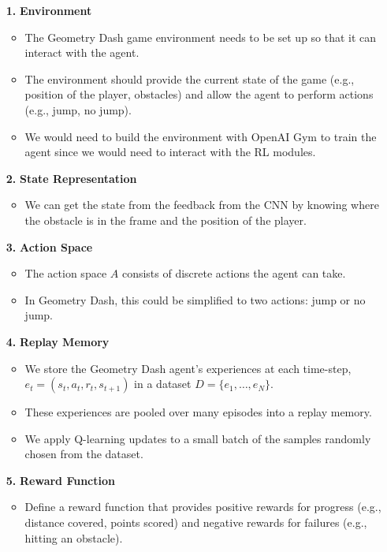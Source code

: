 \documentclass{article} %
\begin{document}
\begin{itemize}
    \item[\textbf{1.}] \textbf{Environment}
    \begin{itemize}
        \item The Geometry Dash game environment needs to be set up so that it 
        can interact with the agent. 
        \item The environment should provide the current state of the game 
        (e.g., position of the player, obstacles) and allow the agent to perform 
        actions (e.g., jump, no jump).
        \item We would need to build the environment with OpenAI Gym to train 
        the agent since we would need to interact with the RL modules.
    \end{itemize}

    \item[\textbf{2.}] \textbf{State Representation}
    \begin{itemize}
        \item We can get the state from the feedback from the CNN by knowing 
        where the obstacle is in the frame and the position of the player.
    \end{itemize}

    \item[\textbf{3.}] \textbf{Action Space}
    \begin{itemize}
        \item The action space \( A \) consists of discrete actions the agent 
        can take. 
        \item In Geometry Dash, this could be simplified to two actions: jump 
        or no jump.
    \end{itemize}

    \item[\textbf{4.}] \textbf{Replay Memory}
    \begin{itemize}
        \item We store the Geometry Dash agent’s experiences at each time-step, 
        \( e_t = (s_t, a_t, r_t, s_{t+1}) \) in a dataset \( D = \{e_1, \ldots, e_N\} \).
        \item These experiences are pooled over many episodes into a replay memory.
        \item We apply Q-learning updates to a small batch of the samples 
        randomly chosen from the dataset.
    \end{itemize}

    \item[\textbf{5.}] \textbf{Reward Function}
    \begin{itemize}
        \item Define a reward function that provides positive rewards for 
        progress (e.g., distance covered, points scored) and negative rewards 
        for failures (e.g., hitting an obstacle).
    \end{itemize}


\end{itemize}
\end{document}
